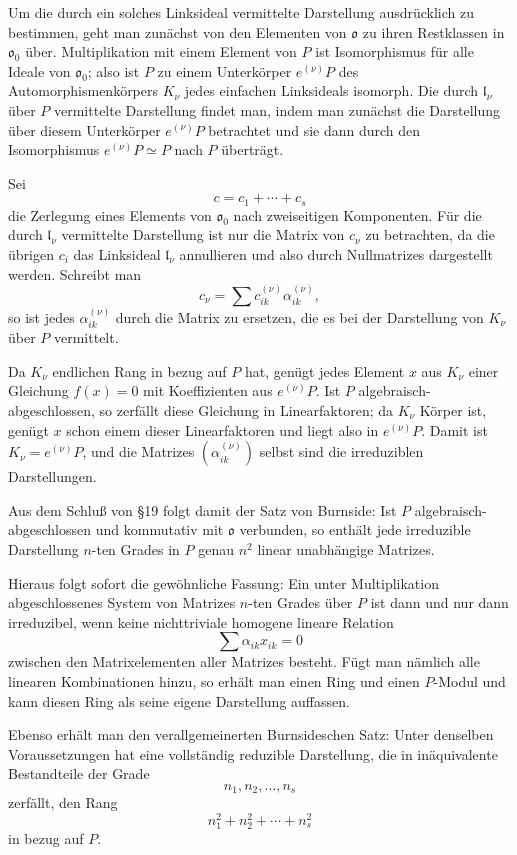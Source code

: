\documentclass[11pt]{article}
\providecommand{\mo}{\mathfrak{o}}
\providecommand{\ml}{\mathfrak{l}}
\begin{document}
Um die durch ein solches Linksideal vermittelte Darstellung ausdrücklich zu bestimmen, geht man zunächst von den Elementen von $\mo$ zu ihren Restklassen in $\mo_0$ über. Multiplikation mit einem Element von $P$ ist Isomorphismus für alle Ideale von $\mo_0$; also ist $P$ zu einem Unterkörper $e^{(\nu)}P$ des Automorphismenkörpers $K_\nu$ jedes einfachen Linksideals isomorph. Die durch $\ml_\nu$ über $P$ vermittelte Darstellung findet man, indem man zunächst die Darstellung über diesem Unterkörper $e^{(\nu)}P$ betrachtet und sie dann durch den Isomorphismus $e^{(\nu)}P\simeq P$ nach $P$ überträgt.

Sei
\[
        c=c_1+\cdots+c_s
\]
die Zerlegung eines Elements von $\mo_0$ nach zweiseitigen Komponenten. Für die durch $\ml_\nu$ vermittelte Darstellung ist nur die Matrix von $c_\nu$ zu betrachten, da die übrigen $c_i$ das Linksideal $\ml_\nu$ annullieren und also durch Nullmatrizes dargestellt werden. Schreibt man
\[
        c_\nu=\sum c_{ik}^{(\nu)}\alpha_{ik}^{(\nu)},
\]
so ist jedes $\alpha_{ik}^{(\nu)}$ durch die Matrix zu ersetzen, die es bei der Darstellung von $K_\nu$ über $P$ vermittelt.

Da $K_\nu$ endlichen Rang in bezug auf $P$ hat, genügt jedes Element $x$ aus $K_\nu$ einer Gleichung $f(x)=0$ mit Koeffizienten aus $e^{(\nu)}P$. Ist $P$ algebraisch-abgeschlossen, so zerfällt diese Gleichung in Linearfaktoren; da $K_\nu$ Körper ist, genügt $x$ schon einem dieser Linearfaktoren und liegt also in $e^{(\nu)}P$. Damit ist $K_\nu=e^{(\nu)}P$, und die Matrizes $(\alpha_{ik}^{(\nu)})$ selbst sind die irreduziblen Darstellungen.

Aus dem Schluß von §19 folgt damit der Satz von Burnside: Ist $P$ algebraisch-abgeschlossen und kommutativ mit $\mo$ verbunden, so enthält jede irreduzible Darstellung $n$-ten Grades in $P$ genau $n^2$ linear unabhängige Matrizes.

Hieraus folgt sofort die gewöhnliche Fassung: Ein unter Multiplikation abgeschlossenes System von Matrizes $n$-ten Grades über $P$ ist dann und nur dann irreduzibel, wenn keine nichttriviale homogene lineare Relation
\[
        \sum \alpha_{ik}x_{ik}=0
\]
zwischen den Matrixelementen aller Matrizes besteht. Fügt man nämlich alle linearen Kombinationen hinzu, so erhält man einen Ring und einen $P$-Modul und kann diesen Ring als seine eigene Darstellung auffassen.

Ebenso erhält man den verallgemeinerten Burnsideschen Satz: Unter denselben Voraussetzungen hat eine vollständig reduzible Darstellung, die in inäquivalente Bestandteile der Grade
\[
        n_1,n_2,\ldots,n_s
\]
zerfällt, den Rang
\[
        n_1^2+n_2^2+\cdots+n_s^2
\]
in bezug auf $P$.
\end{document}
